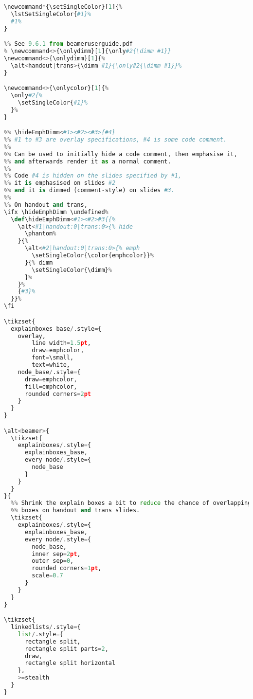 {\begin{lstlisting}[language=Python,style=normal,escapechar=?,morekeywords={True, False}, mathescape]
\newcommand*{\setSingleColor}[1]{%
  \lstSetSingleColor{#1}%
  #1%
}

%% See 9.6.1 from beameruserguide.pdf
% \newcommand<>{\onlydimm}[1]{\only#2{\dimm #1}}
\newcommand<>{\onlydimm}[1]{%
  \alt<handout|trans>{\dimm #1}{\only#2{\dimm #1}}%
}

\newcommand<>{\onlycolor}[1]{%
  \only#2{%
    \setSingleColor{#1}%
  }%
}

%% \hideEmphDimm<#1><#2><#3>{#4}
%% #1 to #3 are overlay specifications, #4 is some code comment.
%%
%% Can be used to initially hide a code comment, then emphasise it,
%% and afterwards render it as a normal comment.
%%
%% Code #4 is hidden on the slides specified by #1,
%% it is emphasised on slides #2
%% and it is dimmed (comment-style) on slides #3.
%%
%% On handout and trans, 
\ifx \hideEmphDimm \undefined%
  \def\hideEmphDimm<#1><#2>#3{{%
    \alt<#1|handout:0|trans:0>{% hide
      \phantom%
    }{%
      \alt<#2|handout:0|trans:0>{% emph
        \setSingleColor{\color{emphcolor}}%
      }{% dimm
        \setSingleColor{\dimm}%
      }%
    }%
    {#3}%
  }}%
\fi

\tikzset{
  explainboxes_base/.style={
    overlay,
		line width=1.5pt, 
		draw=emphcolor, 
		font=\small, 
		text=white,
    node_base/.style={
      draw=emphcolor, 
      fill=emphcolor,
      rounded corners=2pt
    }
  }
}

\alt<beamer>{
  \tikzset{
    explainboxes/.style={
      explainboxes_base,
      every node/.style={
        node_base
      }
    }
  }
}{
  %% Shrink the explain boxes a bit to reduce the chance of overlapping
  %% boxes on handout and trans slides.
  \tikzset{
    explainboxes/.style={
      explainboxes_base,
      every node/.style={
        node_base,
        inner sep=2pt,
        outer sep=0,
        rounded corners=1pt,
        scale=0.7
      }
    }
  }
}

\tikzset{
  linkedlists/.style={
    list/.style={
      rectangle split, 
      rectangle split parts=2,
      draw, 
      rectangle split horizontal
    },
    >=stealth
  }
}


\end{lstlisting}}
